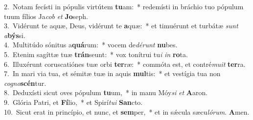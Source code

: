 {2.~}Notam fecísti in pópulis virtútem \textbf{tu}am:~* redemísti in bráchio tuo pópulum tuum fílios Ja\textit{cob} \textit{et} \textbf{Jo}seph.\\
{3.~}Vidérunt te aquæ, Deus, vidérunt te \textbf{a}quæ:~* et timuérunt et turbátæ \textit{sunt} \textit{a}\textbf{býs}si.\\
{4.~}Multitúdo sónitus a\textbf{quá}rum:~* vocem de\textit{dé}\textit{runt} \textbf{nu}bes.\\
{5.~}Etenim sagíttæ tuæ \textbf{trán}seunt:~* vox tonítrui tu\textit{i} \textit{in} \textbf{ro}ta.\\
{6.~}Illuxérunt coruscatiónes tuæ orbi \textbf{ter}ræ:~* commóta est, et contré\textit{mu}\textit{it} \textbf{ter}ra.\\
{7.~}In mari via tua, et sémitæ tuæ in aquis \textbf{mul}tis:~* et vestígia tua non \textit{co}\textit{gno}\textbf{scén}tur.\\
{8.~}Deduxísti sicut oves pópulum \textbf{tu}um,~* in manu Móy\textit{si} \textit{et} \textbf{A}aron.\\
{9.~}Glória Patri, et \textbf{Fí}lio,~* et Spirí\textit{tu}\textit{i} \textbf{San}cto.\\
{10.~}Sicut erat in princípio, et nunc, et \textbf{sem}per,~* et in sǽcula sæcu\textit{ló}\textit{rum}. \textbf{A}men.\\

